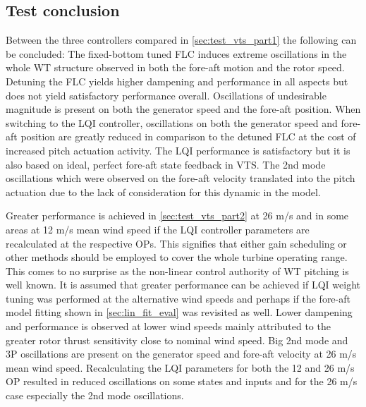 \clearpage
\newpage
\subsection{Test conclusion}
Between the three controllers compared in \cref{sec:test_vts_part1} the following can be concluded: The fixed-bottom tuned FLC induces extreme oscillations in the whole WT structure observed in both the fore-aft motion and the rotor speed. Detuning the FLC yields higher dampening and performance in all aspects but does not yield satisfactory performance overall. Oscillations of undesirable magnitude is present on both the generator speed and the fore-aft position. When switching to the LQI controller, oscillations on both the generator speed and fore-aft position are greatly reduced in comparison to the detuned FLC at the cost of increased pitch actuation activity. The LQI performance is satisfactory but it is also based on ideal, perfect fore-aft state feedback in VTS. The 2nd mode oscillations which were observed on the fore-aft velocity translated into the pitch actuation due to the lack of consideration for this dynamic in the model.

Greater performance is achieved in \cref{sec:test_vts_part2} at 26 m/s and in some areas at 12 m/s mean wind speed if the LQI controller parameters are recalculated at the respective OPs. This signifies that either gain scheduling or other methods should be employed to cover the whole turbine operating range. This comes to no surprise as the non-linear control authority of WT pitching is well known. It is assumed that greater performance can be achieved if LQI weight tuning was performed at the alternative wind speeds and perhaps if the fore-aft model fitting shown in \cref{sec:lin_fit_eval} was revisited as well. Lower dampening and performance is observed at lower wind speeds mainly attributed to the greater rotor thrust sensitivity close to nominal wind speed. Big 2nd mode and 3P oscillations are present on the generator speed and fore-aft velocity at 26 m/s mean wind speed. Recalculating the LQI parameters for both the 12 and 26 m/s OP resulted in reduced oscillations on some states and inputs and for the 26 m/s case especially the 2nd mode oscillations.
